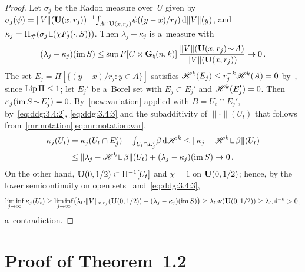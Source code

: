 \documentclass[a4paper,twoside,leqno]{article}
\newcommand{\Gk}{\pgrass{\adim}{\vdim}}        %
\begin{document}
\begin{proof}
    Let $\sigma_j$ be the Radon measure over~$U$ given by $\sigma_j(\psi) =
    \|V\|(\mathbf{U}(x,r_j))^{-1} {\textstyle\int_{A \cap \mathbf{U}(x,r_j)}^{}} \psi((y-x)/r_j) \,\mathrm{d} \|V\|(y)$,
    and $\kappa_j = \Pi_\#(\sigma_j \restrict (\chi F_j(\cdot,S)))$. Then $\lambda_j - \kappa_j$ is
    a~measure with
    \begin{equation}
        \label{eq:ddg:3.4:3}
        (\lambda_j - \kappa_j)(\im S) \le \sup F[C \times \Gk] \, \frac{\|V\|(\oball{x}{r_j}
        \without A)}{\|V\|(\oball{x}{r_j})} \to 0 \,.
    \end{equation}
    The set $E_j = \Pi[\{ (y - x)/r_j : y \in A \}]$ satisfies $\mathscr{H}^{k}(E_j) \le r_j^{-k}
    \mathscr{H}^{k}(A) = 0$ by~\cite[2.10.11]{Federer1969}, since $\operatorname{Lip} \Pi \le 1$; let $E_j'$ be
    a~Borel set with $E_j \subset E_j'$ and $\mathscr{H}^{k}(E_j') = 0$. Then $\kappa_j(\operatorname{im} S \!\sim\!
    E_j') = 0$. By~\ref{new:variation} applied with $B = U_t \cap E_j'$, by~\eqref{eq:ddg:3.4:2},
    \eqref{eq:ddg:3.4:3} and the subadditivity of $\|\cdot\|(U_t)$ that follows
    from~\ref{mr:notation}\eqref{eq:mr:notation:var},
    \begin{displaymath}
        \begin{aligned}
            \kappa_j(U_t) & = \kappa_j(U_t \cap E_j') - \textint{U_t \cap E_j'}{} \beta \ud
            \HM^{\vdim} \le \|\kappa_j - \HM^{\vdim} \restrict \beta\|(U_t) \\
            & \le \|\lambda_j - \HM^{\vdim} \restrict \beta\|(U_t) + (\lambda_j - \kappa_j)(\im S)
            \to 0 \,.
        \end{aligned}
    \end{displaymath}
    On the other hand, $\mathbf{U}(0,1/2) \subset \Pi^{-1}[U_t]$ and $\chi = 1$ on $\mathbf{U}(0,1/2)$;
    hence, by the lower semicontinuity on open sets~\cite[2.6(2)(c)]{Allard1972}
    and~\eqref{eq:ddg:3.4:3},
    \begin{displaymath}
        \liminf_{j \to \infty} \kappa_j(U_t) \ge \liminf_{j \to \infty} \bigl( \lambda_C
        \|V\|_{x,r_j}(\mathbf{U}(0,1/2)) - (\lambda_j - \kappa_j)(\operatorname{im} S) \bigr) \ge \lambda_C
        \nu(\mathbf{U}(0,1/2)) \ge \lambda_C 4^{-k} > 0 \,,
    \end{displaymath}
    a~contradiction.
\end{proof}

\section{Proof of Theorem~1.2}
\label{sec:proof12}
\end{document}
